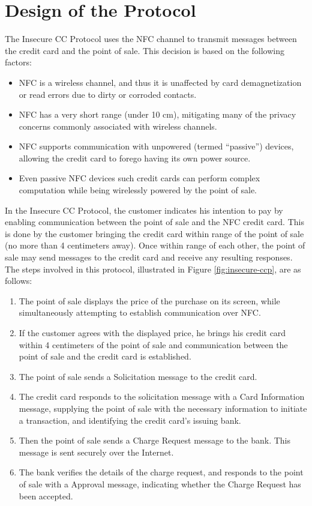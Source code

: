 \section{Design of the Protocol}
\label{sec:insecure-design}

The Insecure CC Protocol uses the NFC channel to transmit messages between the credit card and the point of sale.
This decision is based on the following factors:
\begin{itemize}
\item NFC is a wireless channel, and thus it is unaffected by card demagnetization or read errors due to dirty or corroded contacts.
\item NFC has a very short range (under 10 cm), mitigating many of the privacy concerns commonly associated with wireless channels.
\item NFC supports communication with unpowered (termed ``passive'') devices, allowing the credit card to forego having its own power source.
\item Even passive NFC devices such credit cards can perform complex computation while being wirelessly powered by the point of sale.
\end{itemize}

In the Insecure CC Protocol, the customer indicates his intention to pay by enabling communication between the point of sale and the NFC credit card.
This is done by the customer bringing the credit card within range of the point of sale (no more than 4 centimeters away).
Once within range of each other, the point of sale may send messages to the credit card and receive any resulting responses.
The steps involved in this protocol, illustrated in Figure \ref{fig:insecure-ccp}, are as follows:

\begin{enumerate}
\item The point of sale displays the price of the purchase on its screen, while simultaneously attempting to establish communication over NFC.
\item If the customer agrees with the displayed price, he brings his credit card within 4 centimeters of the point of sale and communication between the point of sale and the credit card is established.
\item The point of sale sends a Solicitation message to the credit card.
\item The credit card responds to the solicitation message with a Card Information message, supplying the point of sale with the necessary information to initiate a transaction,
	and identifying the credit card's issuing bank.
\item Then the point of sale sends a Charge Request message to the bank. This message is sent securely over the Internet.
\item The bank verifies the details of the charge request, and responds to the point of sale with a Approval message, indicating whether the Charge Request has been accepted.
\end{enumerate}


